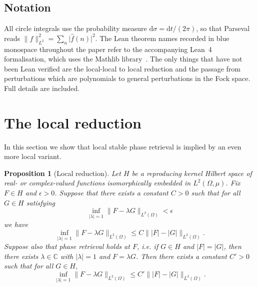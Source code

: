 \documentclass[11pt]{amsart}
\newtheorem{proposition}[theorem]{Proposition}
\theoremstyle{definition}
\theoremstyle{remark}
\newcommand{\C}{\mathbb{C}}
\newcommand{\abs}[1]{\lvert #1 \rvert}
\newcommand{\norm}[1]{\lVert #1 \rVert}
\newcommand{\dd}{\mathrm{d}}
\newcommand{\leanfont}{\normalfont\ttfamily\color{darkblue}}
\begin{document}
\subsection{Notation}\label{sec:notation}

All circle integrals use the probability measure
$\dd\sigma = \dd t/(2\pi)$, so that Parseval reads
$\norm{f}_{L^2}^2 = \sum_n \abs{\hat{f}(n)}^2$.
The Lean theorem names recorded in {\leanfont blue monospace} throughout the
paper refer to the accompanying Lean~4 formalisation, which uses the Mathlib
library~\cite{mathlib}.  The only things that have not been Lean verified are
the local-local to local reduction and the passage from perturbations which
are polynomials to general perturbations in the Fock space. Full details are
included.

\section{The local reduction}\label{sec:local-reduction}

In this section we show that local stable phase retrieval is implied by an
even more local variant.

\begin{proposition}[Local reduction]\label{prop:local-reduction}
Let \(H\) be a reproducing kernel Hilbert space of real- or complex-valued
functions isomorphically embedded in \(L^2(\Omega,\mu)\). Fix \(F\in H\) and
\(\epsilon>0\). Suppose that there exists a constant \(C>0\) such that for
all \(G\in H\) satisfying
\[
\inf_{\abs{\lambda}=1}\norm{F-\lambda G}_{L^2(\Omega)}<\epsilon
\]
we have
\[
\inf_{\abs{\lambda}=1}\norm{F-\lambda G}_{L^2(\Omega)}
\le
C\norm{\abs F-\abs G}_{L^2(\Omega)}.
\]
Suppose also that phase retrieval holds at \(F\), i.e. if \(G\in H\) and
\(\abs F=\abs G\), then there exists \(\lambda\in\C\) with
\(\abs\lambda=1\) and \(F=\lambda G\). Then there exists a constant
\(C'>0\) such that for all \(G\in H\),
\[
\inf_{\abs{\lambda}=1}\norm{F-\lambda G}_{L^2(\Omega)}
\le
C'\norm{\abs F-\abs G}_{L^2(\Omega)}.
\]
\end{proposition}
\end{document}
